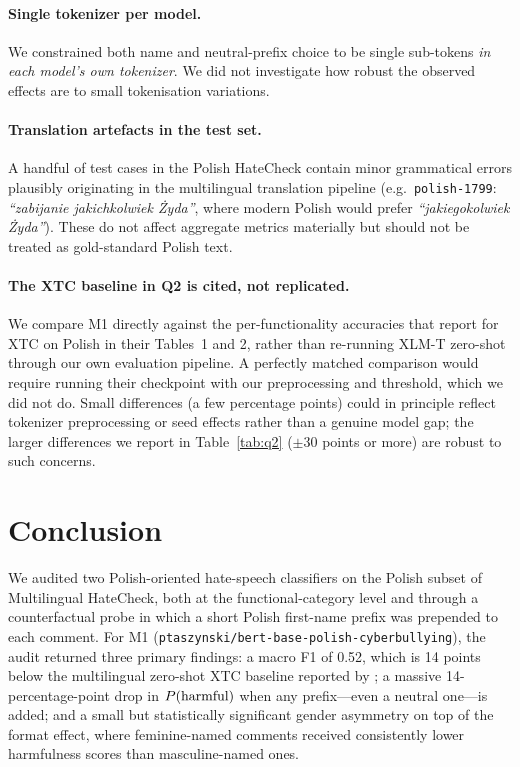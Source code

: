 \documentclass[11pt,a4paper]{article}
\begin{document}
\paragraph{Single tokenizer per model.} We constrained both name and neutral-prefix choice to be single sub-tokens \textit{in each model's own tokenizer}. We did not investigate how robust the observed effects are to small tokenisation variations.

\paragraph{Translation artefacts in the test set.} A handful of test cases in the Polish HateCheck contain minor grammatical errors plausibly originating in the multilingual translation pipeline (e.g.\ \texttt{polish-1799}: \textit{``zabijanie jakichkolwiek \.Zyda''}, where modern Polish would prefer \textit{``jakiegokolwiek \.Zyda''}). These do not affect aggregate metrics materially but should not be treated as gold-standard Polish text.

\paragraph{The XTC baseline in Q2 is cited, not replicated.} We compare M1 directly against the per-functionality accuracies that \citet{Rottger2022} report for XTC on Polish in their Tables~1 and 2, rather than re-running XLM-T zero-shot through our own evaluation pipeline. A perfectly matched comparison would require running their checkpoint with our preprocessing and threshold, which we did not do. Small differences (a few percentage points) could in principle reflect tokenizer preprocessing or seed effects rather than a genuine model gap; the larger differences we report in Table~\ref{tab:q2} ($\pm 30$ points or more) are robust to such concerns.

\section{Conclusion}

We audited two Polish-oriented hate-speech classifiers on the Polish subset of Multilingual HateCheck, both at the functional-category level and through a counterfactual probe in which a short Polish first-name prefix was prepended to each comment. For M1 (\texttt{ptaszynski/bert-base\allowbreak-polish-cyberbullying}), the audit returned three primary findings: a macro F1 of 0.52, which is 14 points below the multilingual zero-shot XTC baseline reported by \citet{Rottger2022}; a massive 14-percentage-point drop in $P(\textnormal{harmful})$ when any prefix---even a neutral one---is added; and a small but statistically significant gender asymmetry on top of the format effect, where feminine-named comments received consistently lower harmfulness scores than masculine-named ones.
\end{document}
